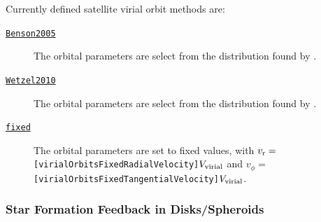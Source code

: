 Currently defined satellite virial orbit methods are:
\begin{description}
 \item [\hyperlink{satellites.merging.virial_orbits.Benson2005.F90:virial_orbits_benson2005:virial_orbital_parameters_benson2005}{{\tt Benson2005}}] The orbital parameters are select from the distribution found by \cite{benson_orbital_2005}.
 \item [\hyperlink{satellites.merging.virial_orbits.Wetzel2010.F90:virial_orbits_wetzel2010:virial_orbital_parameters_wetzel2010}{{\tt Wetzel2010}}] The orbital parameters are select from the distribution found by \cite{wetzel_orbits_2010}.
 \item [\hyperlink{satellites.merging.virial_orbits.fixed.F90:virial_orbits_fixed:virial_orbital_parameters_fixed}{{\tt fixed}}] The orbital parameters are set to fixed values, with $v_{\rm r}=${\tt [virialOrbitsFixedRadialVelocity]}$V_{\rm virial}$ and  $v_\phi=${\tt [virialOrbitsFixedTangentialVelocity]}$V_{\rm virial}$.
\end{description}

\subsubsection{Star Formation Feedback in Disks/Spheroids}

